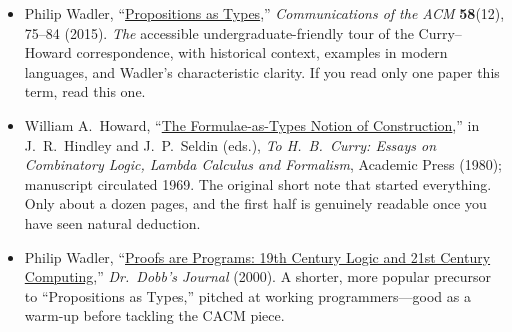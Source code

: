 \documentclass[11pt]{article}
\begin{document}
\begin{itemize}
  \item Philip Wadler, ``\href{https://homepages.inf.ed.ac.uk/wadler/papers/propositions-as-types/propositions-as-types.pdf}{Propositions as Types},'' \emph{Communications of the ACM} \textbf{58}(12), 75--84 (2015). \emph{The} accessible undergraduate-friendly tour of the Curry--Howard correspondence, with historical context, examples in modern languages, and Wadler's characteristic clarity. If you read only one paper this term, read this one.
  \item William A.\ Howard, ``\href{https://www.cs.cmu.edu/~crary/819-f09/Howard80.pdf}{The Formulae-as-Types Notion of Construction},'' in J.\ R.\ Hindley and J.\ P.\ Seldin (eds.), \emph{To H.\ B.\ Curry: Essays on Combinatory Logic, Lambda Calculus and Formalism}, Academic Press (1980); manuscript circulated 1969. The original short note that started everything. Only about a dozen pages, and the first half is genuinely readable once you have seen natural deduction.
  \item Philip Wadler, ``\href{https://homepages.inf.ed.ac.uk/wadler/papers/frege/frege.pdf}{Proofs are Programs: 19th Century Logic and 21st Century Computing},'' \emph{Dr.\ Dobb's Journal} (2000). A shorter, more popular precursor to ``Propositions as Types,'' pitched at working programmers---good as a warm-up before tackling the CACM piece.
\end{itemize}
\end{document}
